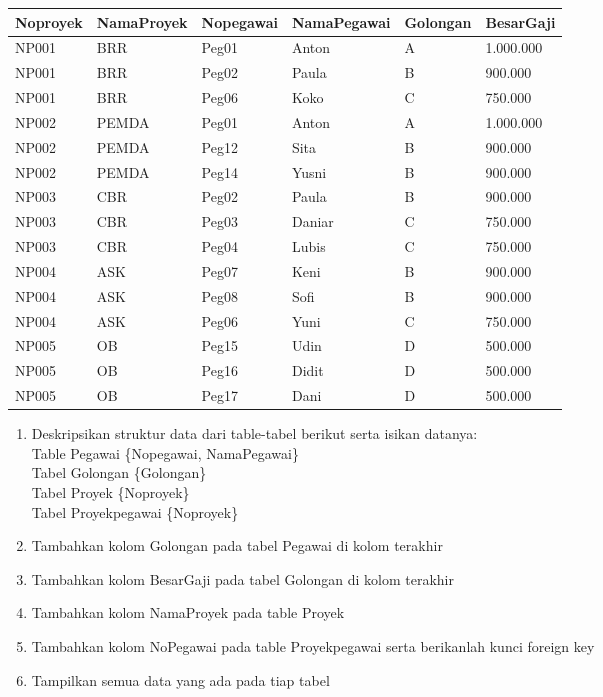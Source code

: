 \documentclass[12pt,titlepage]{article}
\begin{document}
\begin{enumerate}
\begin{tabular}{|l|l|l|l|l|l|}
        \hline
        Noproyek & NamaProyek & Nopegawai & NamaPegawai & Golongan & BesarGaji \\
        \hline
        NP001 & BRR & Peg01 & Anton & A & 1.000.000 \\
        \hline
        NP001 & BRR & Peg02 & Paula & B & 900.000 \\
        \hline
        NP001 & BRR & Peg06 & Koko & C & 750.000 \\
        \hline
        NP002 & PEMDA & Peg01 & Anton & A & 1.000.000 \\
        \hline
        NP002 & PEMDA & Peg12 & Sita & B & 900.000 \\
        \hline
        NP002 & PEMDA & Peg14 & Yusni & B & 900.000 \\
        \hline
        NP003 & CBR & Peg02 & Paula & B & 900.000 \\
        \hline
        NP003 & CBR & Peg03 & Daniar & C & 750.000 \\
        \hline
        NP003 & CBR & Peg04 & Lubis & C & 750.000 \\
        \hline
        NP004 & ASK & Peg07 & Keni & B & 900.000 \\
        \hline
        NP004 & ASK & Peg08 & Sofi & B & 900.000 \\
        \hline
        NP004 & ASK & Peg06 & Yuni & C & 750.000 \\
        \hline
        NP005 & OB & Peg15 & Udin & D & 500.000 \\
        \hline
        NP005 & OB & Peg16 & Didit & D & 500.000 \\
        \hline
        NP005 & OB & Peg17 & Dani & D & 500.000 \\
        \hline
    \end{tabular}
    \begin{enumerate}
        \item Deskripsikan struktur data dari table-tabel berikut serta isikan datanya: \\
        Table Pegawai \{Nopegawai, NamaPegawai\} \\
        Tabel Golongan \{Golongan\} \\
        Tabel Proyek \{Noproyek\} \\
        Tabel Proyekpegawai \{Noproyek\} \\
        \item Tambahkan kolom Golongan pada tabel Pegawai di kolom terakhir
        \item Tambahkan kolom BesarGaji pada tabel Golongan di kolom terakhir
        \item Tambahkan kolom NamaProyek pada table Proyek
        \item Tambahkan kolom NoPegawai pada table Proyekpegawai serta berikanlah kunci foreign key
        \item Tampilkan semua data yang ada pada tiap tabel
    \end{enumerate}
\end{enumerate}
\end{document}
